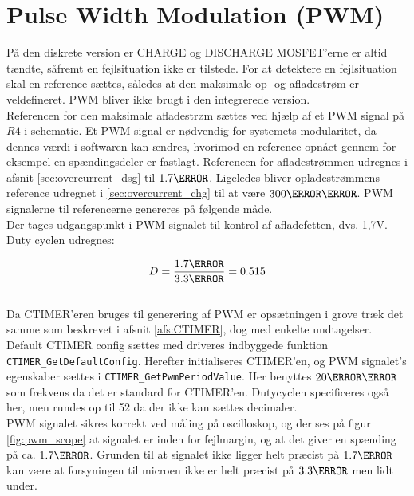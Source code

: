 \section{Pulse Width Modulation (PWM)}\label{afs:PWM}
På den diskrete version er CHARGE og DISCHARGE MOSFET'erne er altid tændte, såfremt en fejlsituation ikke er tilstede. For at detektere en fejlsituation skal en reference sættes, således at den maksimale op- og afladestrøm er veldefineret. PWM bliver ikke brugt i den integrerede version. \\

Referencen for den maksimale afladestrøm sættes ved hjælp af et PWM signal på $R4$ i schematic. Et PWM signal er nødvendig for systemets modularitet, da dennes værdi i softwaren kan ændres, hvorimod en reference opnået gennem for eksempel en spændingsdeler er fastlagt. Referencen for afladestrømmen udregnes i afsnit \ref{sec:overcurrent_dsg} til $1.7\volt$. Ligeledes bliver opladestrømmens reference udregnet i \ref{sec:overcurrent_chg} til at være $300\milli\volt$. PWM signalerne til referencerne genereres på følgende måde. \\

Der tages udgangspunkt i PWM signalet til kontrol af afladefetten, dvs. 1,7V. Duty cyclen udregnes: 

\begin {equation}
D = \frac{1.7\volt}{3.3\volt} = 0.515
\label{eq:duty}
\end {equation}\\

Da CTIMER'eren bruges til generering af PWM er opsætningen i grove træk det samme som beskrevet i afsnit \ref{afs:CTIMER}, dog med enkelte undtagelser. Default CTIMER config sættes med driveres indbyggede funktion \verb|CTIMER_GetDefaultConfig|. Herefter initialiseres CTIMER'en, og PWM signalet's egenskaber sættes i \verb|CTIMER_GetPwmPeriodValue|. Her benyttes $20\kilo\hertz$ som frekvens da det er standard for CTIMER'en. Dutycyclen specificeres også her, men rundes op til 52 da der ikke kan sættes decimaler.\\ 

PWM signalet sikres korrekt ved måling på oscilloskop, og der ses på figur \ref{fig:pwm_scope} at signalet er inden for fejlmargin, og at det giver en spænding på ca. $1.7\volt$. Grunden til at signalet ikke ligger helt præcist på $1.7\volt$ kan være at forsyningen til microen ikke er helt præcist på $3.3\volt$ men lidt under. \\

